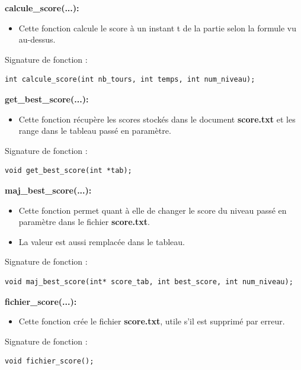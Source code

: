 \documentclass[12pt,french]{article}
\begin{document}
\textbf{calcule\_score(...):}
\begin{itemize}
\item Cette fonction calcule le score à un instant t de la partie selon la formule vu au-dessus.
\end{itemize}
Signature de fonction :
\begin{lstlisting}
int calcule_score(int nb_tours, int temps, int num_niveau);
\end{lstlisting}

\textbf{get\_best\_score(...):}
\begin{itemize}
\item Cette fonction récupère les scores stockés dans le document \textbf{score.txt} et les range dans le tableau passé en paramètre.
\end{itemize}
Signature de fonction :
\begin{lstlisting}
void get_best_score(int *tab);
\end{lstlisting}

\textbf{maj\_best\_score(...):}
\begin{itemize}
\item Cette fonction permet quant à elle de changer le score du niveau passé en paramètre dans le fichier \textbf{score.txt}.
\item La valeur est aussi remplacée dans le tableau.
\end{itemize}
Signature de fonction :
\begin{lstlisting}
void maj_best_score(int* score_tab, int best_score, int num_niveau);
\end{lstlisting}

\textbf{fichier\_score(...):}
\begin{itemize}
\item Cette fonction crée le fichier \textbf{score.txt}, utile s'il est supprimé par erreur.
\end{itemize}
Signature de fonction :
\begin{lstlisting}
void fichier_score();
\end{lstlisting}

\newpage


\listoffigures
\end{document}
